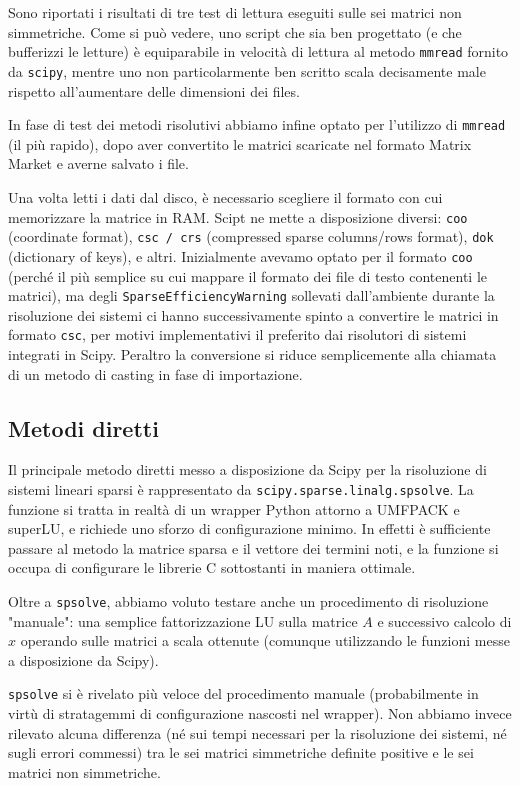 \documentclass[11pt,a4paper]{scrartcl}
\begin{document}
Sono riportati i risultati di tre test di lettura eseguiti sulle sei matrici non simmetriche. Come si può vedere, uno script che sia ben progettato (e che bufferizzi le letture) è equiparabile in velocità di lettura al metodo \texttt{mmread} fornito da \texttt{scipy}, mentre uno non particolarmente ben scritto scala decisamente male rispetto all'aumentare delle dimensioni dei files.

In fase di test dei metodi risolutivi abbiamo infine optato per l'utilizzo di \texttt{mmread} (il più rapido), dopo aver convertito le matrici scaricate nel formato Matrix Market e averne salvato i file.

Una volta letti i dati dal disco, è necessario scegliere il formato con cui memorizzare la matrice in RAM. Scipt ne mette a disposizione diversi: \texttt{coo} (coordinate format), \texttt{csc / crs} (compressed sparse columns/rows format), \texttt{dok} (dictionary of keys), e altri. Inizialmente avevamo optato per il formato \texttt{coo} (perché il più semplice su cui mappare il formato dei file di testo contenenti le matrici), ma degli \texttt{SparseEfficiencyWarning} sollevati dall'ambiente durante la risoluzione dei sistemi ci hanno successivamente spinto a convertire le matrici in formato \texttt{csc}, per motivi implementativi il preferito dai risolutori di sistemi integrati in Scipy. Peraltro la conversione si riduce semplicemente alla chiamata di un metodo di casting in fase di importazione.

\subsection*{Metodi diretti}
Il principale metodo diretti messo a disposizione da Scipy per la risoluzione di sistemi lineari sparsi è rappresentato da \texttt{scipy.sparse.linalg.spsolve}. La funzione si tratta in realtà di un wrapper Python attorno a UMFPACK e superLU, e richiede uno sforzo di configurazione minimo. In effetti è sufficiente passare al metodo la matrice sparsa e il vettore dei termini noti, e la funzione si occupa di configurare le librerie C sottostanti in maniera ottimale.

Oltre a \texttt{spsolve}, abbiamo voluto testare anche un procedimento di risoluzione "manuale": una semplice fattorizzazione LU sulla matrice $A$ e successivo calcolo di $x$ operando sulle matrici a scala ottenute (comunque utilizzando le funzioni messe a disposizione da Scipy).

\texttt{spsolve} si è rivelato più veloce del procedimento manuale (probabilmente in virtù di stratagemmi di configurazione nascosti nel wrapper). Non abbiamo invece rilevato alcuna differenza (né sui tempi necessari per la risoluzione dei sistemi, né sugli errori commessi) tra le sei matrici simmetriche definite positive e le sei matrici non simmetriche. 
\end{document}
